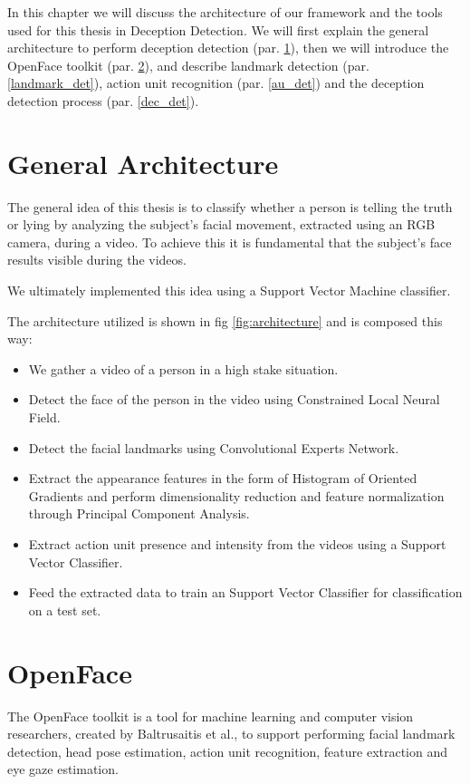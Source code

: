 In this chapter we will discuss the architecture of our framework and the tools used for this thesis in Deception Detection. We will first explain the general architecture to perform deception detection (par. \ref{ga}), then we will introduce the OpenFace toolkit (par. \ref{OpenFace}), and describe landmark detection (par. \ref{landmark_det}), action unit recognition (par. \ref{au_det}) and the deception detection process (par. \ref{dec_det}).

\section{General Architecture} \label{ga}
The general idea of this thesis is to classify whether a person is telling the truth or lying by analyzing the subject's facial movement, extracted using an RGB camera, during a video. To achieve this it is fundamental that the subject's face results visible during the videos.

We ultimately implemented this idea using a Support Vector Machine classifier. 

The architecture utilized is shown in fig \ref{fig:architecture} and is composed this way:

\begin{itemize}
	\item We gather a video of a person in a high stake situation.
	\item Detect the face of the person in the video using Constrained Local Neural Field.
	\item Detect the facial landmarks using Convolutional Experts Network.
	\item Extract the appearance features in the form of Histogram of Oriented Gradients and perform dimensionality reduction and feature normalization through Principal Component Analysis.
	\item Extract action unit presence and intensity from the videos using a Support Vector Classifier.
	\item Feed the extracted data to train an Support Vector Classifier for classification on a test set.
\end{itemize}

\clearpage

\section{OpenFace} \label{OpenFace}
The OpenFace \cite{Baltru2018} toolkit is a tool for machine learning and computer vision researchers, created by Baltrusaitis et al., to support performing facial landmark detection, head pose estimation, action unit recognition, feature extraction and eye gaze estimation. 

